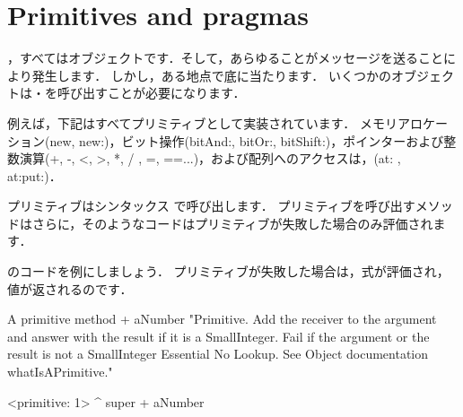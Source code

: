 \documentclass[a4paper,10pt,twoside]{book}
\begin{document}
\section{Primitives and pragmas}

，すべてはオブジェクトです．そして，あらゆることがメッセージを送ることにより発生します．
しかし，ある地点で底に当たります．
いくつかのオブジェクトは・を呼び出すことが必要になります．

例えば，下記はすべてプリミティブとして実装されています．
メモリアロケーション(new, new:)，ビット操作(bitAnd:, bitOr:, bitShift:)，ポインターおよび整数演算(+, -, <, >, *, / , =, ==...)，および配列へのアクセスは，(at: , at:put:)．


プリミティブはシンタックス で呼び出します．
プリミティブを呼び出すメソッドはさらに，そのようなコードはプリミティブが失敗した場合のみ評価されます．

のコードを例にしましょう．
プリミティブが失敗した場合は，式が評価され，値が返されるのです．

\begin{method}[primitive]{A primitive method}
+ aNumber 
  "Primitive. Add the receiver to the argument and answer with the result
  if it is a SmallInteger. Fail if the argument or the result is not a
  SmallInteger  Essential  No Lookup. See Object documentation whatIsAPrimitive."

  <primitive: 1>
  ^ super + aNumber
\end{method}
\end{document}
